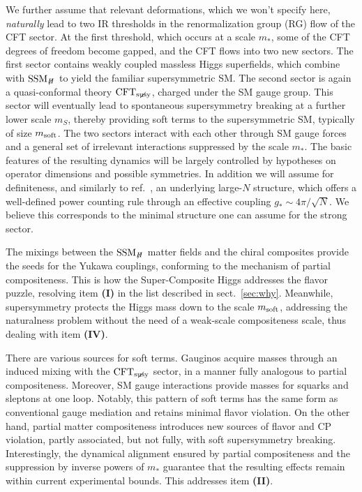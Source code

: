 \documentclass[a4paper,12pt]{article}
\def\sec#1{sect.~\ref{#1}}
\def\mst{m_*}
\def\mS{m_S}
\def\msoft{m_{\rm soft}}
\def\SSMnH{{\rm SSM}_{H \!\!\!\!\!\not\,\,\,\,\,}}
\def\CFTs{{\rm CFT}_ {{\rm susy}\! \! \! \! \! \! \! \!\diagup \,\,\,}}
\begin{document}
We further assume that relevant deformations, which we won't specify here, {\it naturally} lead to two IR thresholds in the renormalization group (RG) flow of the CFT sector. 
At the first threshold, which occurs at a scale $\mst$, some of the CFT degrees of freedom become gapped, and the CFT flows into two new sectors. The first sector contains weakly coupled massless Higgs superfields, which combine with $\SSMnH$ to yield the familiar supersymmetric SM. The second sector is again a quasi-conformal theory $\CFTs$, charged under the SM gauge group. This sector will eventually lead to spontaneous supersymmetry breaking at a further lower scale $\mS$, thereby providing soft terms to the supersymmetric SM, typically of size $\msoft$. The two sectors interact with each other through SM gauge forces and a general set of irrelevant interactions suppressed by the scale $\mst$. The basic features of the resulting dynamics will be largely controlled by hypotheses on  operator dimensions and possible symmetries. In addition we will assume for definiteness, and similarly to ref.~\cite{Giudice:2007fh}, an underlying large-$N$ structure, which  offers a well-defined power counting rule through an effective coupling $g_*\sim 4\pi/\sqrt N$. We believe this corresponds to the minimal structure one can assume for the strong sector.


The mixings between the  $\SSMnH$ matter  fields and the chiral composites provide the seeds for the Yukawa couplings, conforming to the mechanism of partial compositeness. This is how the Super-Composite Higgs addresses the flavor puzzle, resolving item \textbf{(I)} in the list described in \sec{sec:why}. Meanwhile, supersymmetry protects the Higgs mass down to the scale $\msoft$, addressing the naturalness problem without the need of a weak-scale compositeness scale, thus dealing with item \textbf{(IV)}. 

There are various sources for soft terms. Gauginos acquire masses through an induced mixing with the $\CFTs$ sector, in a manner fully analogous to partial compositeness. Moreover, SM gauge interactions provide masses for squarks and sleptons at one loop. Notably, this pattern of soft terms has the same form as conventional gauge mediation and retains minimal flavor violation.  On the other hand, partial matter compositeness introduces new sources of flavor and CP violation, partly associated, but not fully, with soft supersymmetry breaking.  Interestingly,  the dynamical alignment ensured by partial compositeness and the  suppression by inverse powers of $\mst$ guarantee that
 the resulting effects remain within current experimental bounds. This addresses item \textbf{(II)}. 
\end{document}
